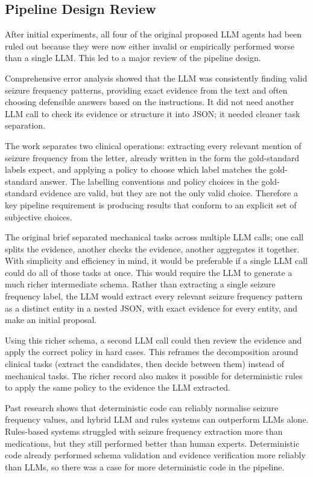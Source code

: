 \documentclass[conference]{IEEEtran}
\begin{document}
\subsection{Pipeline Design Review}

After initial experiments, all four of the original
proposed LLM agents had been ruled out because
they were now either invalid or empirically performed
worse than a single LLM. This led to a major review
of the pipeline design. 

Comprehensive error analysis showed that the LLM
was consistently finding valid seizure frequency
patterns, providing exact evidence from the text
and often choosing defensible answers based 
on the instructions. It did not need another LLM call to
check its evidence or structure it into JSON; it 
needed cleaner task separation. 

The work separates two clinical operations: extracting 
every relevant mention of seizure frequency from the 
letter, already written in the form the gold-standard 
labels expect, and applying a policy to choose which 
label matches the gold-standard answer. The
labelling conventions and policy choices in the 
gold-standard evidence are valid, but they are not
the only valid choice. Therefore a key pipeline 
requirement is producing results that conform to 
an explicit set of subjective choices. 

The original brief separated mechanical tasks 
across multiple LLM calls; one call splits the 
evidence, another checks the evidence, another 
aggregates it together. With simplicity and 
efficiency in mind, it would be preferable if a 
single LLM call could do all of those tasks at once. 
This would require the LLM to generate a much richer 
intermediate schema. Rather than extracting a single 
seizure frequency label, the LLM would extract
every relevant seizure frequency pattern as 
a distinct entity in a nested JSON, with exact
evidence for every entity, and make an initial 
proposal. 

Using this richer schema, a second LLM call 
could then review the evidence and apply the correct 
policy in hard cases. This reframes the decomposition 
around clinical tasks (extract the candidates, then 
decide between them) instead of mechanical tasks. The 
richer record also makes it possible for deterministic 
rules to apply the same policy to the evidence the LLM 
extracted.

Past research shows that deterministic code
can reliably normalise seizure frequency values,
and hybrid LLM and rules systems can outperform
LLMs alone. Rules-based systems 
struggled with seizure frequency extraction more
than medications, but they still performed better
than human experts. Deterministic code already
performed schema validation and evidence 
verification more reliably than LLMs, so there was 
a case for more deterministic code in the pipeline.
\end{document}
